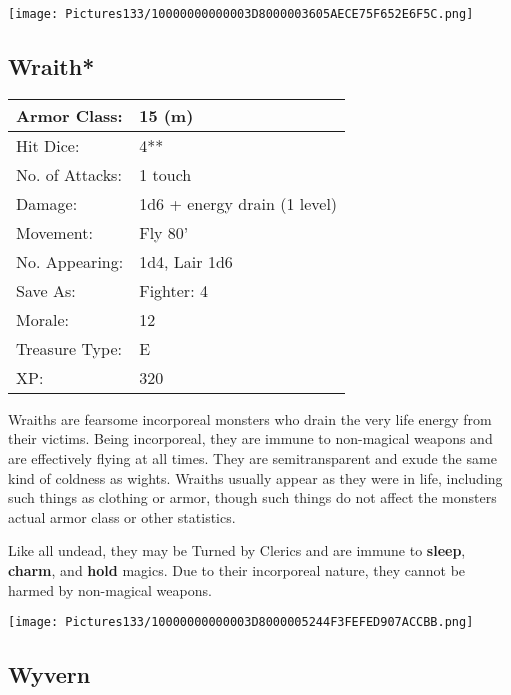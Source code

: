 \documentclass[a4paper,twoside,openany,10pt]{book}
\begin{document}
\begin{multicols}{2}
\begin{center} \texttt{[image: Pictures133/10000000000003D8000003605AECE75F652E6F5C.png]} \end{center}


\subsection*{Wraith*}\label{wraith}

\begin{tabularx}{0.50\textwidth}{@{}lX@{}}
Armor Class: & 15 (m) \\\hline
Hit Dice: & 4** \\\hline
No. of Attacks: & 1 touch \\\hline
Damage: & 1d6 + energy drain (1 level) \\\hline
Movement: & Fly 80' \\\hline
No. Appearing: & 1d4, Lair 1d6 \\\hline
Save As: & Fighter: 4 \\\hline
Morale: & 12 \\\hline
Treasure Type: & E \\\hline
XP: & 320 \\\hline
\end{tabularx}\medskip

Wraiths are fearsome incorporeal monsters who drain the very life energy from their victims. Being incorporeal, they are immune to non-magical weapons and are effectively flying at all times. They are semitransparent and exude the same kind of coldness as wights. Wraiths usually appear as they were in life, including such things as clothing or armor, though such things do not affect the monsters actual armor class or other statistics.

Like all undead, they may be Turned by Clerics and are immune to \textbf{sleep}, \textbf{charm},\textbf{ }and \textbf{hold} magics. Due to their incorporeal nature, they cannot be harmed by non-magical weapons.

\begin{center} \texttt{[image: Pictures133/10000000000003D8000005244F3FEFED907ACCBB.png]} \end{center}

\subsection*{Wyvern}\label{wyvern}


\end{multicols}
\end{document}
